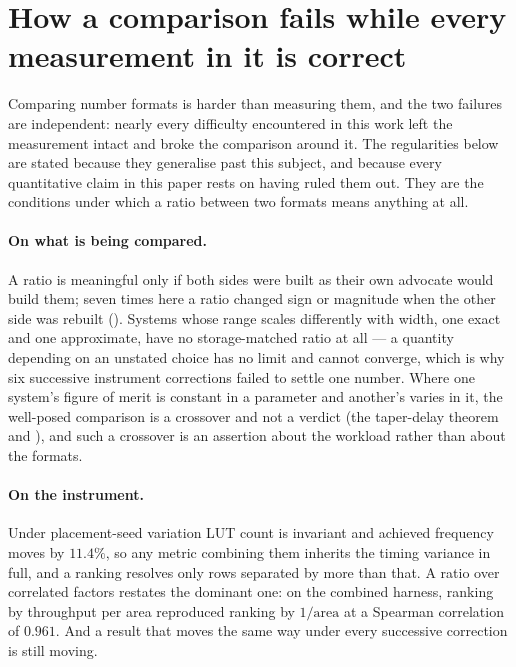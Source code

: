 \section{How a comparison fails while every measurement in it is correct}
\label{sec:selfcheck}

Comparing number formats is harder than measuring them, and the two failures
are independent: nearly every difficulty encountered in this work left the
measurement intact and broke the comparison around it. The regularities below are
stated because they generalise past this subject, and because every quantitative
claim in this paper rests on having ruled them out. They are the conditions under
which a ratio between two formats means anything at all.

\paragraph{On what is being compared.} A ratio is meaningful only if both sides
were built as their own advocate would build them; seven times here a ratio
changed sign or magnitude when the other side was rebuilt
(). Systems whose range scales differently with
width, one exact and one approximate, have no storage-matched ratio at all --- a
quantity depending on an unstated choice has no limit and cannot converge, which
is why six successive instrument corrections failed to settle one number. Where
one system's figure of merit is constant in a parameter and another's varies in
it, the well-posed comparison is a crossover and not a verdict
(the taper-delay theorem and ), and such a
crossover is an assertion about the workload rather than about the formats.

\paragraph{On the instrument.} Under placement-seed variation LUT count is
invariant and achieved frequency moves by $11.4\%$, so any metric combining them
inherits the timing variance in full, and a ranking resolves only rows separated
by more than that. A ratio over correlated factors restates the dominant one: on
the combined harness, ranking by throughput per area reproduced ranking by
$1/\text{area}$ at a Spearman correlation of $0.961$. And a result that moves the
same way under every successive correction is still moving.

